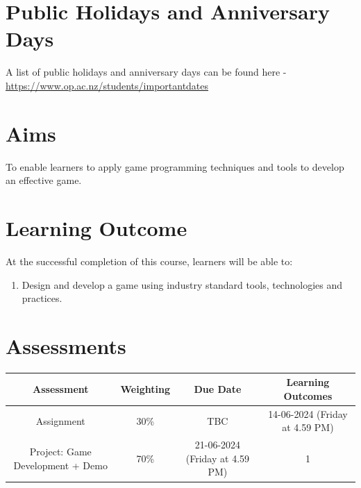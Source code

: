 \documentclass{article}
\begin{document}
\section*{Public Holidays and Anniversary Days}
A list of public holidays and anniversary days can be found here - \href{https://www.op.ac.nz/students/importantdates}{https://www.op.ac.nz/students/importantdates}

\section*{Aims}
To enable learners to apply game programming techniques and tools to develop an effective game.

\section*{Learning Outcome}
At the successful completion of this course, learners will be able to:
\begin{enumerate}
	\item Design and develop a game using industry standard tools, technologies and practices.
\end{enumerate}

\section*{Assessments}
\renewcommand{\arraystretch}{1.5}
\begin{tabular}{|c|c|c|c|}
	\hline
	\textbf{Assessment}                                 & \textbf{Weighting} & \textbf{Due Date}            & \textbf{Learning Outcomes} \\ \hline
	\small Assignment  & \small 30\%        & \small TBC   & \small 14-06-2024 (Friday at 4.59 PM)                   \\ \hline
	\small Project: Game Development + Demo & \small 70\%        & \small 21-06-2024 (Friday at 4.59 PM)   & \small 1                   \\ \hline
\end{tabular} 
\end{document}
